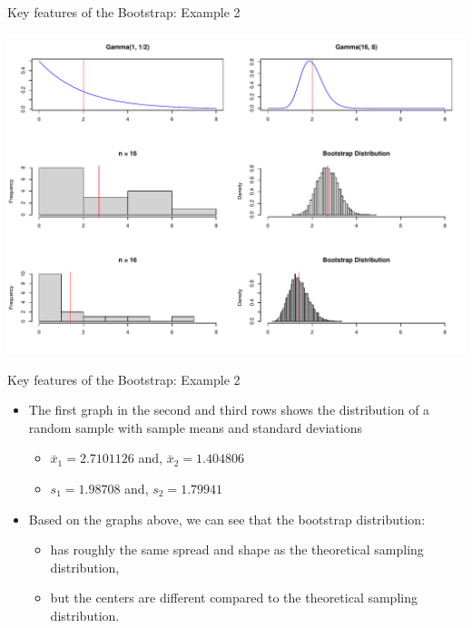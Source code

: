 \documentclass[
  ignorenonframetext,
]{beamer}
\providecommand{\tightlist}{%
  \setlength{\itemsep}{0pt}\setlength{\parskip}{0pt}}
\begin{document}
\begin{frame}{Key features of the Bootstrap: Example 2}
\protect\hypertarget{key-features-of-the-bootstrap-example-2-2}{}
\tiny

\begin{center}\includegraphics[width=0.9\linewidth,height=0.75\textheight]{Week10_Lect_files/figure-beamer/unnamed-chunk-5-1} \end{center}
\normalsize
\end{frame}

\begin{frame}{Key features of the Bootstrap: Example 2}
\protect\hypertarget{key-features-of-the-bootstrap-example-2-3}{}
\begin{itemize}
\item
  The first graph in the second and third rows shows the distribution of
  a random sample with sample means and standard deviations

  \begin{itemize}
  \tightlist
  \item
    \(\bar{x}_1= 2.7101126\) and, \(\bar{x}_2=1.404806\)
  \item
    \(s_1= 1.98708\) and, \(s_2=1.79941\)
  \end{itemize}
\item
  Based on the graphs above, we can see that the bootstrap distribution:

  \begin{itemize}
  \tightlist
  \item
    has roughly the same spread and shape as the theoretical sampling
    distribution,
  \item
    but the centers are different compared to the theoretical sampling
    distribution.
  \end{itemize}
\end{itemize}
\end{frame}
\end{document}
